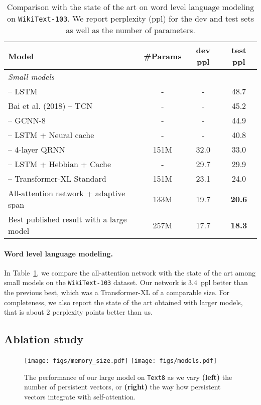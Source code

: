 \documentclass{article}
\begin{document}
\begin{table}[t]
\centering
\caption{
Comparison with the state of the art on word level language modeling on \texttt{WikiText-103}.
We report perplexity (ppl) for the dev and test sets as well as the number of parameters.
}
\label{tab:wikitext103}
\begin{tabular}{lccc}
\toprule
Model & \#Params & dev ppl & test ppl\\
\midrule
\multicolumn{4}{l}{\emph{Small models}}\\
\citet{grave2016improving} – LSTM & - & - & 48.7\\
Bai et al. (2018) – TCN & - & - & 45.2\\
\citet{dauphin2017language} – GCNN-8 & - & - & 44.9\\
\citet{grave2016improving} – LSTM + Neural cache & - & - & 40.8\\
\citet{merity2018analysis} – 4-layer QRNN & 151M & 32.0 & 33.0\\
\citet{rae2018fast} – LSTM + Hebbian + Cache & - & 29.7 & 29.9\\
\citet{dai2019transformer} – Transformer-XL Standard & 151M & 23.1 & 24.0\\
All-attention network + adaptive span                       & 133M & 19.7  & \bf  20.6 \\
\midrule
Best published result with a large model~\citep{dai2019transformer} & 257M & 17.7 & \bf 18.3 \\
\bottomrule
\end{tabular}
\end{table}


\paragraph{Word level language modeling.}
In Table~\ref{tab:wikitext103}, we compare the all-attention network with the state of the art among small models on the \texttt{WikiText-103} dataset.
Our network is $3.4$~ppl better than the previous best, which was a Transformer-XL of a comparable size.
For completeness, we also report the state of the art obtained with larger models, that is about 2 perplexity points better than us.

\subsection{Ablation study}
\begin{figure}
  \centering
  \texttt{[image: figs/memory\_size.pdf]}
  \texttt{[image: figs/models.pdf]} \\
  \caption{The performance of our large model on \texttt{Text8} as we vary {\bf(left)} the number of persistent vectors, or {\bf (right)} the way how persistent vectors integrate with self-attention.}
  \label{fig:memsz}
\end{figure}
\end{document}
